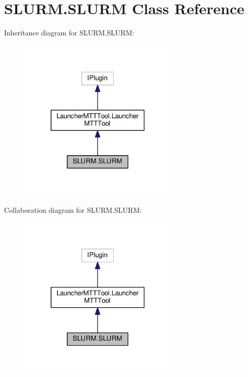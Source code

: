\hypertarget{class_s_l_u_r_m_1_1_s_l_u_r_m}{\section{S\-L\-U\-R\-M.\-S\-L\-U\-R\-M Class Reference}
\label{class_s_l_u_r_m_1_1_s_l_u_r_m}
}


Inheritance diagram for S\-L\-U\-R\-M.\-S\-L\-U\-R\-M\-:
\nopagebreak
\begin{figure}[H]
\begin{center}
\leavevmode
\includegraphics[width=218pt]{class_s_l_u_r_m_1_1_s_l_u_r_m__inherit__graph}
\end{center}
\end{figure}


Collaboration diagram for S\-L\-U\-R\-M.\-S\-L\-U\-R\-M\-:
\nopagebreak
\begin{figure}[H]
\begin{center}
\leavevmode
\includegraphics[width=218pt]{class_s_l_u_r_m_1_1_s_l_u_r_m__coll__graph}
\end{center}
\end{figure}
